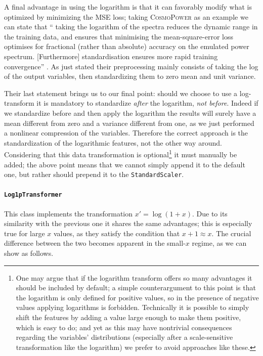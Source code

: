 A final advantage in using the logarithm is that it can favorably modify what is optimized by minimizing the MSE loss; taking \textsc{CosmoPower} as an example we can state that `` taking the logarithm of the spectra reduces the dynamic range in the training data, and ensures that minimising the mean-square-error loss optimises for fractional (rather than absolute) accuracy on the emulated power spectrum. [Furthermore] standardisation ensures more rapid training convergence'' \cite{cosmopower}. As just stated their preprocessing mainly consists of taking the log of the output variables, then standardizing them to zero mean and unit variance.

Their last statement brings us to our final point: should we choose to use a log-transform it is mandatory to standardize \emph{after} the logarithm, \emph{not before}. Indeed if we standardize before and then apply the logarithm the results will surely have a mean different from zero and a variance different from one, as we just performed a nonlinear compression of the variables. Therefore the correct approach is the standardization of the logarithmic features, not the other way around.
Considering that this data transformation is optional\footnote{One may argue that if the logarithm transform offers so many advantages it should be included by default; a simple counterargument to this point is that the logarithm is only defined for positive values, so in the presence of negative values applying logarithms is forbidden. Technically it is possible to simply shift the features by adding a value large enough to make them positive, which is easy to do; and yet as this may have nontrivial consequences regarding the variables' distributions (especially after a scale-sensitive transformation like the logarithm) we prefer to avoid approaches like these.} it must manually be added; the above point means that we cannot simply append it to the default one, but rather should prepend it to the \texttt{StandardScaler}.

\paragraph{\texttt{Log1pTransformer}}
This class implements the transformation $x' = \log(1+x)$. Due to its similarity with the previous one it shares the same advantages; this is especially true for large $x$ values, as they satisfy the condition that $x+1\approx x$. The crucial difference between the two becomes apparent in the small-$x$ regime, as we can show as follows.

